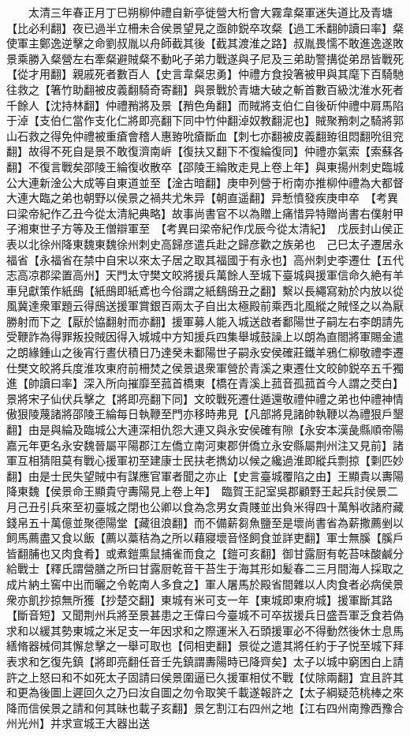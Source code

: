 　　太清三年春正月丁巳朔柳仲禮自新亭徙營大桁會大霧韋粲軍迷失道比及青塘【比必利翻】夜已過半立柵未合侯景望見之亟帥鋭卒攻粲【過工禾翻帥讀曰率】粲使軍主鄭逸逆擊之命劉叔胤以舟師截其後【截其渡淮之路】叔胤畏懦不敢進逸遂敗景乘勝入粲營左右牽粲避賊粲不動叱子弟力戰遂與子尼及三弟助警搆從弟昂皆戰死【從才用翻】親戚死者數百人【史言韋粲忠勇】仲禮方食投箸被甲與其麾下百騎馳往救之【箸竹助翻被皮義翻騎奇寄翻】與景戰於青塘大破之斬首數百級沈淮水死者千餘人【沈持林翻】仲禮矟將及景【矟色角翻】而賊將支伯仁自後斫仲禮中肩馬陷于淖【支伯仁當作支化仁將即亮翻下同中竹仲翻淖奴教翻泥也】賊聚矟刺之騎將郭山石救之得免仲禮被重瘡會稽人惠臶吮瘡斷血【刺七亦翻被皮義翻臶徂悶翻吮徂兖翻】故得不死自是景不敢復濟南㟁【復扶又翻下不復綸復同】仲禮亦氣索【索蘇各翻】不復言戰矣邵陵王綸復收散卒【邵陵王綸敗走見上卷上年】與東揚州刺史臨城公大連新淦公大成等自東道並至【淦古暗翻】庚申列營于桁南亦推柳仲禮為大都督大連大臨之弟也朝野以侯景之禍共尤朱异【朝直遥翻】异慙憤發疾庚申卒　【考異曰梁帝紀作乙丑今從太清紀典略】故事尚書官不以為贈上痛惜异特贈尚書右僕射甲子湘東世子方等及王僧辯軍至　【考異曰梁帝紀作戊辰今從太清紀】　戊辰封山侯正表以北徐州降東魏東魏徐州刺史高歸彦遣兵赴之歸彦歡之族弟也　己巳太子遷居永福省【永福省在禁中自宋以來太子居之取其福國于有永也】高州刺史李遷仕【五代志高凉郡梁置高州】天門太守樊文皎將援兵萬餘人至城下臺城與援軍信命久絶有羊車兒獻策作紙䲭【紙䲭即紙鳶也今俗謂之紙鷂䲭丑之翻】繫以長繩寫勑於内放以從風冀達衆軍題云得䲭送援軍賞銀百兩太子自出太極殿前乘西北風縱之賊怪之以為厭勝射而下之【厭於恊翻射而亦翻】援軍募人能入城送啟者鄱陽世子嗣左右李朗請先受鞭詐為得罪叛投賊因得入城城中方知援兵四集舉城鼓譟上以朗為直閤將軍賜金遣之朗緣鍾山之後宵行晝伏積日乃達癸未鄱陽世子嗣永安侯確莊鐵羊鴉仁柳敬禮李遷仕樊文皎將兵度淮攻東府前柵焚之侯景退衆軍營於青溪之東遷仕文皎帥鋭卒五千獨進【帥讀曰率】深入所向摧靡至菰首橋東【橋在青溪上菰音孤菰首今人謂之茭白】景將宋子仙伏兵擊之【將即亮翻下同】文皎戰死遷仕遁還敬禮仲禮之弟也仲禮神情傲狠陵蔑諸將邵陵王綸每日執鞭至門亦移時弗見【凡部將見諸帥執鞭以為禮狠戶墾翻】由是與綸及臨城公大連深相仇怨大連又與永安侯確有隙【永安本漢彘縣順帝陽嘉元年更名永安魏晉屬平陽郡江左僑立南河東郡併僑立永安縣屬荆州注又見前】諸軍互相猜阻莫有戰心援軍初至建康士民扶老擕幼以候之纔過淮即縱兵剽掠【㔄匹妙翻】由是士民失望賊中有謀應官軍者聞之亦止【史言臺城覆陷之由】王顯貴以夀陽降東魏【侯景命王顯貴守夀陽見上卷上年】　臨賀王記室吳郡顧野王起兵討侯景二月己丑引兵來至初臺城之閉也公卿以食為念男女貴賤並出負米得四十萬斛收諸府藏錢帛五十萬億並聚德陽堂【藏徂浪翻】而不備薪芻魚鹽至是壞尚書省為薪撒薦剉以飼馬薦盡又食以飯【薦以藁秸為之所以藉寢壞音怪飼食並詳吏翻】軍士無膎【膎戶皆翻脯也又肉食肴】或煮鎧熏鼠捕雀而食之【鎧可亥翻】御甘露厨有乾苔味酸鹹分給戰士【釋氏謂營膳之所曰甘露厨乾音干苔生于海其形如髪春二三月間海人採取之成片納土窖中出而曬之令乾南人多食之】軍人屠馬於殿省間雜以人肉食者必病侯景衆亦飢抄掠無所獲【抄楚交翻】東城有米可支一年【東城即東府城】援軍斷其路【斷音短】又聞荆州兵將至景甚患之王偉曰今臺城不可卒拔援兵日盛吾軍乏食若偽求和以緩其勢東城之米足支一年因求和之際運米入石頭援軍必不得動然後休士息馬繕脩器械伺其懈怠擊之一舉可取也【伺相吏翻】景從之遣其將任約于子悦至城下拜表求和乞復先鎮【將即亮翻任音壬先鎮謂夀陽時已降齊矣】太子以城中窮困白上請許之上怒曰和不如死太子固請曰侯景圍逼已久援軍相仗不戰【仗除兩翻】宜且許其和更為後圖上遲回久之乃曰汝自圖之勿令取笑千載遂報許之【太子綱疑范桃棒之來降而信侯景之請和何其昧也載子亥翻】景乞割江右四州之地【江右四州南豫西豫合州光州】并求宣城王大器出送
